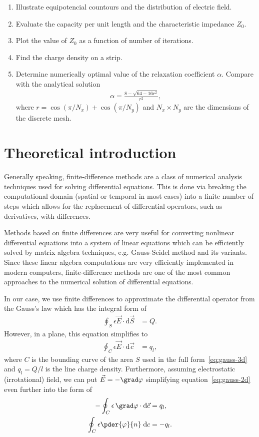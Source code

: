 \documentclass[11pt,a4paper]{article}
\begin{document}
\begin{enumerate}[label=(\alph*)]
    \item Illustrate equipotencial countours and the distribution of electric field.
    \item Evaluate the capacity per unit length and the characteristic impedance $Z_0$.
    \item Plot the value of $Z_0$ as a function of number of iterations.
    \item Find the charge density on a strip.
    \item Determine numerically optimal value of the relaxation coefficient $\alpha$. Compare with the analytical solution
    \begin{align}
        \label{eq:alpha-analytical-solution}
        \alpha = \frac{8-\sqrt{64-16r^2}}{r^2},
    \end{align}
    where $r = \cos(\pi/N_x) + \cos(\pi/N_y)$ and $N_x \times N_y$ are the dimensions of the discrete mesh.
\end{enumerate}

\newpage\section{Theoretical introduction}
Generally speaking, finite-difference methods are a class of numerical analysis techniques used for solving differential equations. This is done via breaking the computational domain (spatial or temporal in most cases) into a finite number of steps which allows for the replacement of differential operators, such as derivatives, with differences.

Methods based on finite differences are very useful for converting nonlinear differential equations into a system of linear equations which can be efficiently solved by matrix algebra techniques, e.g. Gauss-Seidel method and its variants. Since these linear algebra computations are very efficiently implemented in modern computers, finite-difference methods are one of the most common approaches to the numerical solution of differential equations.

In our case, we use finite differences to approximate the differential operator from the Gauss's law which has the integral form of
\begin{align}
    \label{eq:gauss-3d}
    \oint_S \epsilon \vec E \cdot \mathrm d \vec S &= Q.
\end{align}
However, in a plane, this equation simplifies to
\begin{align}
    \label{eq:gauss-2d}
    \oint_C \epsilon \vec E \cdot \mathrm d \vec c &= q_l,
\end{align}
where $C$ is the bounding curve of the area $S$ used in the full form~\ref{eq:gauss-3d} and $q_l = Q/l$ is the line charge density. Furthermore, assuming electrostatic (irrotational) field, we can put $\vec E = -\grad \varphi$ simplifying equation~\ref{eq:gauss-2d} even further into the form of
\begin{align}
    -\oint_C \epsilon \, \grad \varphi \cdot \mathrm d \vec c &= q_l,
\\
    \label{eq:gauss-final}
    \oint_C \epsilon \pder{\varphi}{n} \; \mathrm d c &= -q_l.
\end{align}
\end{document}
